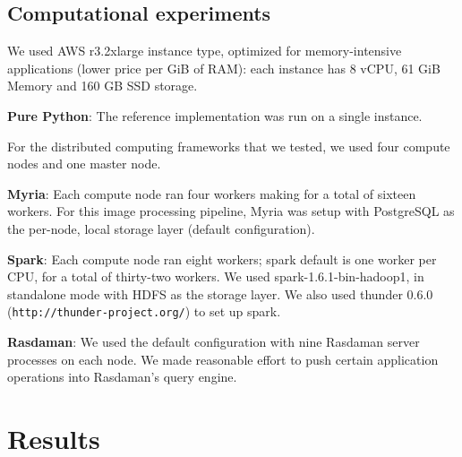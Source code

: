 \documentclass[a0,landscape]{a0poster}
\begin{document}
\begin{multicols}{3}
\subsection*{Computational experiments}
We used AWS r3.2xlarge instance type, optimized for memory-intensive applications (lower price per GiB of RAM): each instance has 8 vCPU, 61 GiB Memory and 160 GB SSD storage.

\textbf{Pure Python}: The reference implementation was run on a single instance.

For the distributed computing frameworks that we tested, we used four compute
nodes and one master node.

\textbf{Myria}:   Each compute node ran four workers making for a total of sixteen workers. For this image processing pipeline, Myria was setup with PostgreSQL as the per-node, local storage layer (default configuration).

\textbf{Spark}: Each compute node ran eight workers; spark default is one worker
per CPU, for a total of thirty-two workers. We used spark-1.6.1-bin-hadoop1, in
standalone mode with HDFS as the storage layer. We also used thunder 0.6.0
(\texttt{http://thunder-project.org/}) to set up spark.

\textbf{Rasdaman}: We used the default configuration with  nine Rasdaman server processes on each node. We made reasonable effort to push certain application operations into Rasdaman's query engine.


\section*{Results}


\end{multicols}
\end{document}

